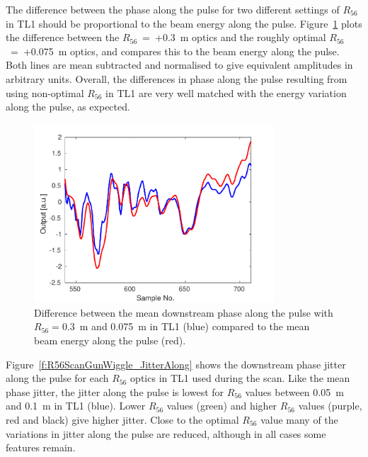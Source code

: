 The difference between the phase along the pulse for two different settings of \(R_{56}\) in TL1 should be proportional to the beam energy along the pulse. Figure~\ref{f:r56Scan_comparisonPhaseEnergy} plots the difference between the \(R_{56}\)~=~+0.3~m optics and the roughly optimal \(R_{56}\)~=~+0.075~m optics, and compares this to the beam energy along the pulse. Both lines are mean subtracted and normalised to give equivalent amplitudes in arbitrary units. Overall, the differences in phase along the pulse resulting from using non-optimal \(R_{56}\) in TL1 are very well matched with the energy variation along the pulse, as expected. 

\begin{figure}
  \centering
  \includegraphics[width=0.8\textwidth]{Figures/propagation/r56Scan_comparisonPhaseEnergy}
  \caption{Difference between the mean downstream phase along the pulse with \(R_{56} = 0.3\)~m and 0.075~m in TL1 (blue) compared to the mean beam energy along the pulse (red).}
  \label{f:r56Scan_comparisonPhaseEnergy}
\end{figure}

Figure~\ref{f:R56ScanGunWiggle_JitterAlong} shows the downstream phase jitter along the pulse for each \(R_{56}\) optics in TL1 used during the scan. Like the mean phase jitter, the jitter along the pulse is lowest for \(R_{56}\) values between 0.05~m and 0.1~m in TL1 (blue). Lower \(R_{56}\) values (green) and higher \(R_{56}\) values (purple, red and black) give higher jitter. Close to the optimal \(R_{56}\) value many of the variations in jitter along the pulse are reduced, although in all cases some features remain.

